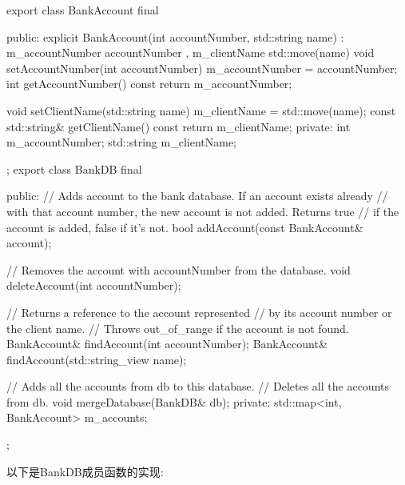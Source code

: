 \begin{cpp}
export class BankAccount final
{
    public:
        explicit BankAccount(int accountNumber, std::string name)
            : m_accountNumber { accountNumber }, m_clientName { std::move(name) }{}
        void setAccountNumber(int accountNumber) {
            m_accountNumber = accountNumber; }
        int getAccountNumber() const { return m_accountNumber; }

        void setClientName(std::string name) { m_clientName = std::move(name); }
        const std::string& getClientName() const { return m_clientName; }
    private:
        int m_accountNumber;
        std::string m_clientName;
};
export class BankDB final
{
    public:
        // Adds account to the bank database. If an account exists already
        // with that account number, the new account is not added. Returns true
        // if the account is added, false if it's not.
        bool addAccount(const BankAccount& account);

        // Removes the account with accountNumber from the database.
        void deleteAccount(int accountNumber);

        // Returns a reference to the account represented
        // by its account number or the client name.
        // Throws out_of_range if the account is not found.
        BankAccount& findAccount(int accountNumber);
        BankAccount& findAccount(std::string_view name);

        // Adds all the accounts from db to this database.
        // Deletes all the accounts from db.
        void mergeDatabase(BankDB& db);
    private:
        std::map<int, BankAccount> m_accounts;
};
\end{cpp}

以下是BankDB成员函数的实现:

